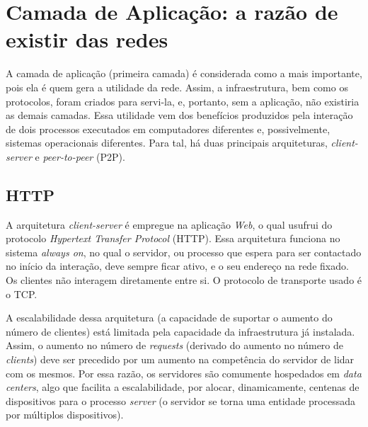 




\hypertarget{camada-de-aplicauxe7uxe3o-a-razuxe3o-de-existir-das-redes}{%
\chapter{Camada de Aplicação: a razão de existir das redes}\label{camada-de-aplicauxe7uxe3o-a-razuxe3o-de-existir-das-redes}}

A camada de aplicação (primeira camada) é considerada como a mais
importante, pois ela é quem gera a utilidade da rede. Assim, a
infraestrutura, bem como os protocolos, foram criados para servi-la, e,
portanto, sem a aplicação, não existiria as demais camadas. Essa
utilidade vem dos benefícios produzidos pela interação de dois processos
executados em computadores diferentes e, possivelmente, sistemas
operacionais diferentes. Para tal, há duas principais arquiteturas,
\emph{client-server} e \emph{peer-to-peer} (P2P).

\hypertarget{http}{%
\section{HTTP}\label{http}}

A arquitetura \emph{client-server} é empregue na aplicação \emph{Web}, o
qual usufrui do protocolo \emph{Hypertext Transfer Protocol} (HTTP).
Essa arquitetura funciona no sistema \emph{always on}, no qual o
servidor, ou processo que espera para ser contactado no início da
interação, deve sempre ficar ativo, e o seu endereço na rede fixado. Os
clientes não interagem diretamente entre si. O protocolo de transporte
usado é o TCP.

A escalabilidade dessa arquitetura (a capacidade de suportar o aumento
do número de clientes) está limitada pela capacidade da infraestrutura
já instalada. Assim, o aumento no número de \emph{requests} (derivado do
aumento no número de \emph{clients}) deve ser precedido por um aumento
na competência do servidor de lidar com os mesmos. Por essa razão, os
servidores são comumente hospedados em \emph{data centers}, algo que
facilita a escalabilidade, por alocar, dinamicamente, centenas de
dispositivos para o processo \emph{server} (o servidor se torna uma
entidade processada por múltiplos dispositivos).

